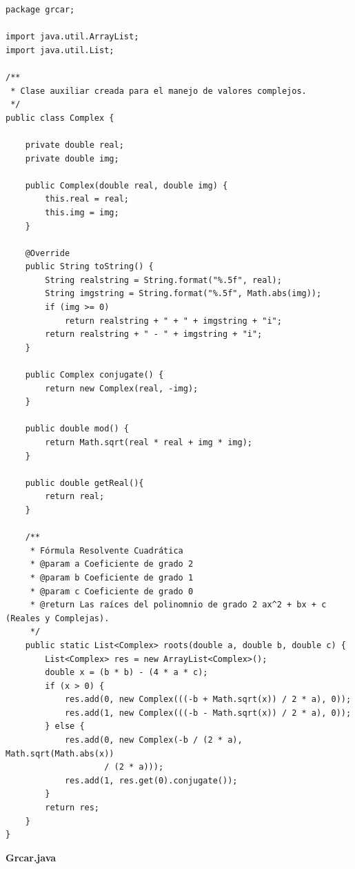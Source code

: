 \documentclass[a4paper,10pt,spanish]{article}
\begin{document}
\begin{verbatim}
package grcar;

import java.util.ArrayList;
import java.util.List;

/**
 * Clase auxiliar creada para el manejo de valores complejos.
 */
public class Complex {

	private double real;
	private double img;

	public Complex(double real, double img) {
		this.real = real;
		this.img = img;
	}

	@Override
	public String toString() {
		String realstring = String.format("%.5f", real);
		String imgstring = String.format("%.5f", Math.abs(img));
		if (img >= 0)
			return realstring + " + " + imgstring + "i";
		return realstring + " - " + imgstring + "i";
	}

	public Complex conjugate() {
		return new Complex(real, -img);
	}

	public double mod() {
		return Math.sqrt(real * real + img * img);
	}

	public double getReal(){
		return real;
	}

	/**
	 * Fórmula Resolvente Cuadrática
	 * @param a Coeficiente de grado 2
	 * @param b	Coeficiente de grado 1
	 * @param c Coeficiente de grado 0
	 * @return Las raíces del polinomnio de grado 2 ax^2 + bx + c (Reales y Complejas).
	 */
	public static List<Complex> roots(double a, double b, double c) {
		List<Complex> res = new ArrayList<Complex>();
		double x = (b * b) - (4 * a * c);
		if (x > 0) {
			res.add(0, new Complex(((-b + Math.sqrt(x)) / 2 * a), 0));
			res.add(1, new Complex(((-b - Math.sqrt(x)) / 2 * a), 0));
		} else {
			res.add(0, new Complex(-b / (2 * a), Math.sqrt(Math.abs(x))
					/ (2 * a)));
			res.add(1, res.get(0).conjugate());
		}
		return res;
	}
}

\end{verbatim}

\begin{center}
\textbf{Grcar.java}
\end{center}
\end{document}
